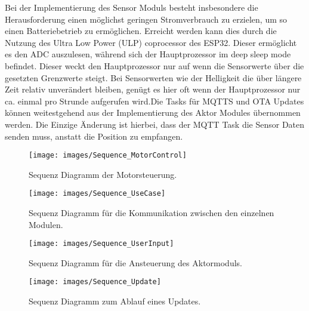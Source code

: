 Bei der Implementierung des Sensor Moduls besteht insbesondere die Herausforderung einen möglichst geringen Stromverbrauch zu erzielen, um so einen Batteriebetrieb zu ermöglichen. Erreicht werden kann dies durch die Nutzung des Ultra Low Power (ULP) coprocessor des ESP32. Dieser ermöglicht es den ADC auszulesen, während sich der Hauptprozessor im deep sleep mode befindet. Dieser weckt den Hauptprozessor nur auf wenn die Sensorwerte über die gesetzten Grenzwerte steigt. Bei Sensorwerten wie der Helligkeit die über längere Zeit relativ unverändert bleiben, genügt es hier oft wenn der Hauptprozessor nur ca. einmal pro Strunde aufgerufen wird.Die Tasks für MQTTS und OTA Updates können weitestgehend aus der Implementierung des Aktor Modules übernommen werden. Die Einzige Änderung ist hierbei, dass der MQTT Task die Sensor Daten senden muss, anstatt die Position zu empfangen.

\begin{figure}[hbt]
	\centering
	\texttt{[image: images/Sequence\_MotorControl]}
	\caption[Sequence Diagramm MotorControl]{Sequenz Diagramm der Motorsteuerung.}
	\label{fig:SequenceMotorControl}
\end{figure}

\begin{figure}[hbt]
	\centering
	\texttt{[image: images/Sequence\_UseCase]}
	\caption[Sequence UseCase]{Sequenz Diagramm für die Kommunikation zwischen den einzelnen Modulen.}
	\label{fig:Sequence_UseCase}
\end{figure}

\begin{figure}[hbt]
	\centering
	\texttt{[image: images/Sequence\_UserInput]}
	\caption[Sequence UserInput]{Sequenz Diagramm für die Ansteuerung des Aktormoduls.}
	\label{fig:Sequence_UserInput}
\end{figure}



\begin{figure}[hbt]
	\centering
	\texttt{[image: images/Sequence\_Update]}
	\caption[Sequence Update]{Sequenz Diagramm zum Ablauf eines Updates.}
	\label{fig:Sequence_Update}
\end{figure}
